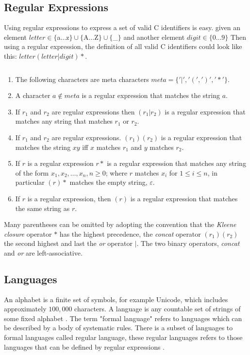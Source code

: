 \subsection{Regular Expressions}
\begin{example}\label{regexpEx}
Using regular expressions to express a set of valid C identifiers is easy.
given an element $letter \in \{$a$ \dots $z$\} \cup \{$A$ \dots $Z$\} \cup 
\{$\_$\}$
and another element $digit \in \{0 \dots 9\}$
Then using a regular expression, the definition of all valid C identifiers 
could look like this: $letter (letter | digit)*$. 
\end{example}
\begin{definition}\label{regexp} $ $\\
\begin{enumerate}
  \item The following characters are meta characters $meta = \{ '|', '(', ')', '*' \}$.
  \item A character $a \notin meta$ is a regular expression that matches the 
      string $a$.
  \item If $r_1$ and $r_2$ are regular expressions then $(r_1 | r_2)$ is a 
      regular expression that matches any string that matches $r_1$ or $r_2$.
  \item If $r_1$ and $r_2$ are regular expressions. $(r_1)(r_2)$ is a regular
      expression that matches the string $xy$ iff $x$ matches $r_1$
      and $y$ matches $r_2$.
  \item If $r$ is a regular expression $r*$ is a regular expression that
      matches any string of the form $x_1, x_2, \dots , x_n, n \geq 0$;
      where $r$ matches $x_i$ for $1 \leq i \leq n$, in particular $(r)*$ 
      matches the empty string, $\varepsilon$.
  \item If $r$ is a regular expression, then $(r)$ is a regular expression that
      matches the same string as $r$.
\end{enumerate}
\end{definition}
Many parentheses can be omitted by adopting the convention that the \emph{Kleene
closure} operator $*$ has the highest precedence, the \emph{concat} operator $(r_1)(r_2)$ the second highest and last the \emph{or}
operator $|$. The two binary operators, \emph{concat} and \emph{or} are
left-associative.
\subsection{Languages}
An alphabet is a finite set of symbols, for example Unicode, which 
includes approximately $100,000$ characters. A language is any 
countable set of strings of some fixed alphabet \cite{Aho2006}.
The term "formal language" refers to languages which can be described by a body 
of systematic rules. There is a subset of languages to formal languages called 
regular language, these regular languages refers to those languages 
that can be defined by regular expressions \cite{Ranta2012}.

